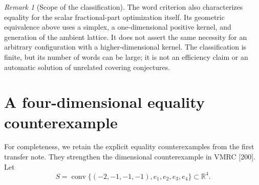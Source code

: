 \documentclass[11pt,a4paper]{article}
\theoremstyle{remark}\newtheorem{remark}[theorem]{Remark}
\DeclareMathOperator{\conv}{conv}
\newcommand{\R}{\mathbb R}\newcommand{\Z}{\mathbb Z}
\begin{document}
\begin{remark}[Scope of the classification]\label{part:wordscope}
The word criterion also characterizes equality for the scalar
fractional-part optimization itself.  Its geometric equivalence
above uses a simplex, a one-dimensional positive kernel, and
generation of the ambient lattice.  It does not assert the same
necessity for an arbitrary configuration with a higher-dimensional
kernel.  The classification is finite, but its number of words
can be large; it is not an efficiency claim or an automatic
solution of unrelated covering conjectures.
\end{remark}


\section{A four-dimensional equality counterexample}
For completeness, we retain the explicit equality counterexamples
from the first transfer note. They strengthen the dimensional
counterexample in VMRC [200]. Let
\begin{equation}\label{eq:S4}
 S=\conv\{(-2,-1,-1,-1),e_1,e_2,e_3,e_4\}\subset\R^4.
\end{equation}
\end{document}
